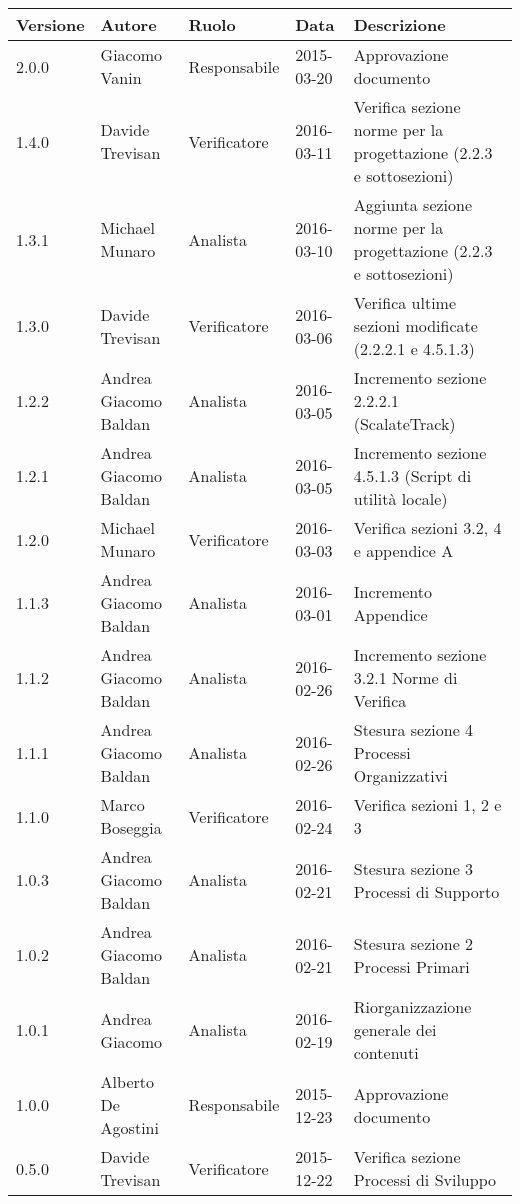 \documentclass{scalatekids-article}
\begin{document}
\begin{center}
  \begin{longtable}{| l | l | l | l | p{5cm} |}
    \hline
    Versione & Autore & Ruolo & Data & Descrizione \\
    \hline
    2.0.0 & Giacomo Vanin & Responsabile & 2015-03-20 & Approvazione documento\\
    \hline
    1.4.0 & Davide Trevisan & Verificatore & 2016-03-11 & Verifica sezione norme per la progettazione (2.2.3 e sottosezioni)\\
    \hline
    1.3.1 & Michael Munaro & Analista & 2016-03-10 & Aggiunta sezione norme per la progettazione (2.2.3 e sottosezioni)\\
    \hline
    1.3.0 & Davide Trevisan & Verificatore & 2016-03-06 & Verifica ultime sezioni modificate (2.2.2.1 e 4.5.1.3)\\
    \hline
    1.2.2 & Andrea Giacomo Baldan & Analista & 2016-03-05 & Incremento sezione 2.2.2.1 (ScalateTrack)\\
    \hline
    1.2.1 & Andrea Giacomo Baldan & Analista & 2016-03-05 & Incremento sezione 4.5.1.3 (Script di utilità locale)\\
    \hline
    1.2.0 & Michael Munaro & Verificatore & 2016-03-03 & Verifica sezioni 3.2, 4 e appendice A \\
    \hline
    1.1.3 & Andrea Giacomo Baldan & Analista & 2016-03-01 & Incremento Appendice\\
    \hline
    1.1.2 & Andrea Giacomo Baldan & Analista & 2016-02-26 & Incremento sezione 3.2.1 Norme di Verifica\\
    \hline
    1.1.1 & Andrea Giacomo Baldan & Analista & 2016-02-26 & Stesura sezione 4 Processi Organizzativi\\
    \hline
    1.1.0 & Marco Boseggia & Verificatore & 2016-02-24 & Verifica sezioni 1, 2 e 3\\
    \hline
    1.0.3 & Andrea Giacomo Baldan & Analista & 2016-02-21 & Stesura sezione 3 Processi di Supporto\\
    \hline
    1.0.2 & Andrea Giacomo Baldan & Analista & 2016-02-21 & Stesura sezione 2 Processi Primari\\
    \hline
    1.0.1 & Andrea Giacomo & Analista & 2016-02-19 & Riorganizzazione generale dei contenuti\\
    \hline
    1.0.0 & Alberto De Agostini & Responsabile & 2015-12-23 & Approvazione documento\\
    \hline
    0.5.0 & Davide Trevisan & Verificatore & 2015-12-22 & Verifica sezione Processi di Sviluppo\\

\end{longtable}
\end{center}
\end{document}

